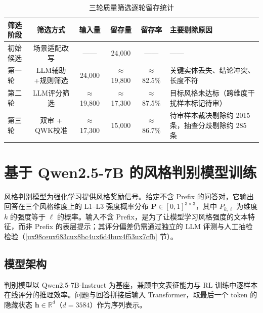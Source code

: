 \documentclass[fontset=fandol,type=master,campus=shenzhen,etitleauto=true]{hithesisbook}
\begin{document}
\begin{table}[htbp]
\centering
\caption{三轮质量筛选逐轮留存统计}
\label{tab:style-data-dist}
\small
\setlength{\tabcolsep}{4pt}
\renewcommand{\arraystretch}{1.1}
\begin{tabular}{l c c c c p{4.2cm}}
\toprule
\textbf{筛选阶段} & \textbf{筛选方式} & \textbf{输入量} & \textbf{留存量} & \textbf{留存率} & \textbf{主要剔除原因} \\
\midrule
初始候选   & 场景适配改写  &  ——   & 24{,}000 &  ——    &  —— \\
第一轮     & LLM辅助+规则筛选 & 24{,}000 & $\approx$19{,}800 & $\approx$82.5\% & 关键实体丢失、结论冲突、长度不符 \\
第二轮     & LLM评分筛选   & $\approx$19{,}800 & $\approx$17{,}300 & $\approx$87.5\% & 目标风格未达标（跨维度干扰样本标记待审） \\
第三轮     & 双审 + QWK校准 & $\approx$17{,}300 & 15{,}000 & $\approx$86.7\% & 待审样本裁决剔除约 2015 条，抽查分歧剔除约 285 条 \\
\bottomrule
\end{tabular}
\end{table}

\section{基于 Qwen2.5-7B 的风格判别模型训练}\label{ux57faux4e8e-qwen2.5-7b-ux7684ux98ceux683cux5224ux522bux6a21ux578bux8badux7ec3}

风格判别模型为强化学习提供风格奖励信号。给定不含 Prefix 的问答对，它输出回答在三个风格维度上的 L1--L3 强度概率分布 $\mathbf{P} \in [0,1]^{3 \times 3}$，其中 $P_{k,\ell}$ 为维度 $k$ 的强度等于 $\ell$ 的概率。输入不含 Prefix，是为了让模型学习风格强度的文本特征，而非 Prefix 的表层提示；其评分偏差仍需通过独立的 LLM 评测与人工抽检检验（\ref{ux98ceux683cux8bc4ux6d4bux4f53ux7cfb} 节）。

\subsection{模型架构}\label{ux6a21ux578bux67b6ux6784ux8bbeux8ba1}

判别模型以 Qwen2.5-7B-Instruct 为基座，兼顾中文表征能力与 RL 训练中逐样本在线评分的推理效率。问题与回答拼接后输入 Transformer，取最后一个 token 的隐藏状态 $\mathbf{h} \in \mathbb{R}^{d}$（$d = 3584$）作为序列表示。
\end{document}
